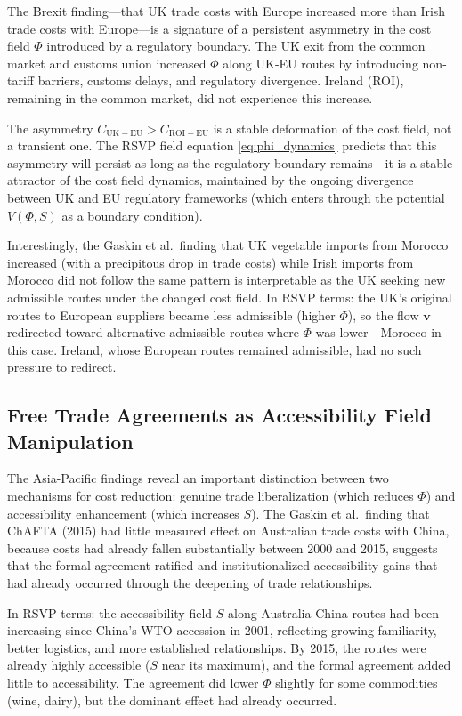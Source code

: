 \documentclass[12pt]{article}
\begin{document}
The Brexit finding---that UK trade costs with Europe increased more than Irish trade costs with Europe---is a signature of a persistent asymmetry in the cost field $\Phi$ introduced by a regulatory boundary. The UK exit from the common market and customs union increased $\Phi$ along UK-EU routes by introducing non-tariff barriers, customs delays, and regulatory divergence. Ireland (ROI), remaining in the common market, did not experience this increase.

The asymmetry $C_{\mathrm{UK}-\mathrm{EU}} > C_{\mathrm{ROI}-\mathrm{EU}}$ is a stable deformation of the cost field, not a transient one. The RSVP field equation \eqref{eq:phi_dynamics} predicts that this asymmetry will persist as long as the regulatory boundary remains---it is a stable attractor of the cost field dynamics, maintained by the ongoing divergence between UK and EU regulatory frameworks (which enters through the potential $V(\Phi, S)$ as a boundary condition).

Interestingly, the Gaskin et al.\ finding that UK vegetable imports from Morocco increased (with a precipitous drop in trade costs) while Irish imports from Morocco did not follow the same pattern is interpretable as the UK seeking new admissible routes under the changed cost field. In RSVP terms: the UK's original routes to European suppliers became less admissible (higher $\Phi$), so the flow $\mathbf{v}$ redirected toward alternative admissible routes where $\Phi$ was lower---Morocco in this case. Ireland, whose European routes remained admissible, had no such pressure to redirect.

\subsection{Free Trade Agreements as Accessibility Field Manipulation}

The Asia-Pacific findings reveal an important distinction between two mechanisms for cost reduction: genuine trade liberalization (which reduces $\Phi$) and accessibility enhancement (which increases $S$). The Gaskin et al.\ finding that ChAFTA (2015) had little measured effect on Australian trade costs with China, because costs had already fallen substantially between 2000 and 2015, suggests that the formal agreement ratified and institutionalized accessibility gains that had already occurred through the deepening of trade relationships.

In RSVP terms: the accessibility field $S$ along Australia-China routes had been increasing since China's WTO accession in 2001, reflecting growing familiarity, better logistics, and more established relationships. By 2015, the routes were already highly accessible ($S$ near its maximum), and the formal agreement added little to accessibility. The agreement did lower $\Phi$ slightly for some commodities (wine, dairy), but the dominant effect had already occurred.
\end{document}
